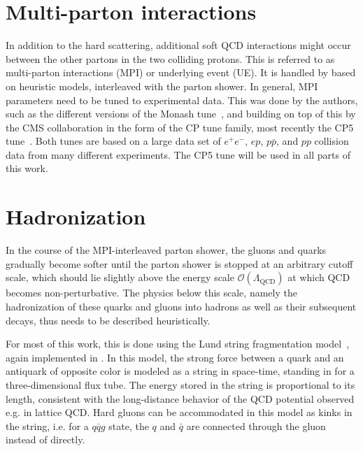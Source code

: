 \section{Multi-parton interactions}
\label{sec:mc:mpi}

In addition to the hard scattering, additional soft QCD interactions might occur between the other partons in the two colliding protons. This is referred to as multi-parton interactions (MPI) or underlying event (UE). It is handled by \pythia based on heuristic models, interleaved with the parton shower. In general, MPI parameters need to be tuned to experimental data. This was done by the \pythia authors, such as the different versions of the Monash tune~\cite{Skands:2014pea}, and building on top of this by the CMS collaboration in the form of the CP tune family, most recently the CP5 tune~\cite{CMS:GEN-17-001}. Both tunes are based on a large data set of $e^+e^-$, $ep$, $p\bar{p}$, and $pp$ collision data from many different experiments. The CP5 tune will be used in all parts of this work.

\section{Hadronization}
\label{sec:mc:hadronization}

In the course of the MPI-interleaved parton shower, the gluons and quarks gradually become softer until the parton shower is stopped at an arbitrary cutoff scale, which should lie slightly above the energy scale $\mathcal{O}(\Lambda_{\mathrm{QCD}})$ at which QCD becomes non-perturbative.
The physics below this scale, namely 
the hadronization of these quarks and gluons into hadrons as well as their subsequent decays, thus needs to be described heuristically.

For most of this work, this is done using the Lund string fragmentation model~\cite{Andersson:1983ia,Sjostrand:1984ic}, again implemented in \pythia. In this model, the strong force between a quark and an antiquark of opposite color is modeled as a string in space-time, standing in for a three-dimensional flux tube. The energy stored in the string is proportional to its length, consistent with the long-distance behavior of the QCD potential observed e.g. in lattice QCD. Hard gluons can be accommodated in this model as kinks in the string, i.e. for a $q\bar{q}g$ state, the $q$ and $\bar{q}$ are connected through the gluon instead of directly.


